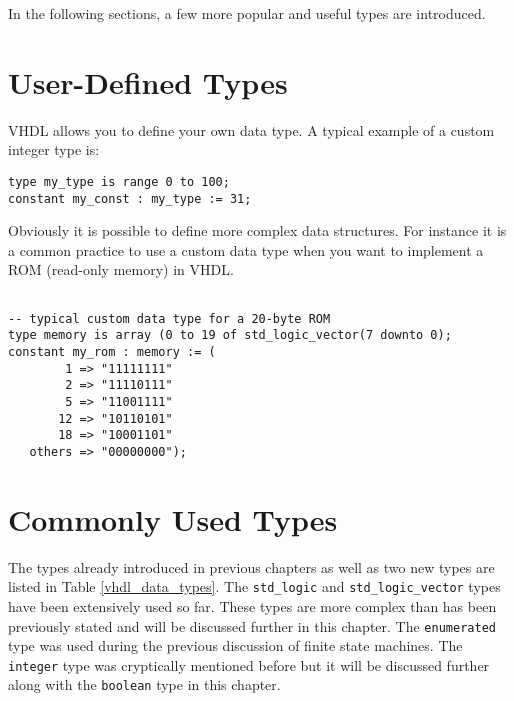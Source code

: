 In the following sections, a few more popular and useful types are introduced.

\section{User-Defined Types}
VHDL allows you to define your own data type. A typical example of a custom integer type is:

\noindent
\texttt{type my\_type is range 0 to 100;}\\
\texttt{constant my\_const : my\_type := 31;}

\noindent
Obviously it is possible to define more complex data structures. For instance it is a common practice to use a custom data type when you want to implement a ROM (read-only memory) in VHDL.

\noindent
\begin{minipage}{0.99\linewidth}
\begin{lstlisting}

-- typical custom data type for a 20-byte ROM
type memory is array (0 to 19 of std_logic_vector(7 downto 0);
constant my_rom : memory := (
        1 => "11111111"
        2 => "11110111"
        5 => "11001111"
       12 => "10110101"
       18 => "10001101"
   others => "00000000");
\end{lstlisting}
\end{minipage}

\section{Commonly Used Types}
The types already introduced in previous chapters as well as two new types are listed in Table \ref{vhdl_data_types}. The \texttt{std\_logic} and \texttt{std\_logic\_vector} types have been extensively used so far. These types are more complex than has been previously stated and will be discussed further in this chapter. The \texttt{enumerated} type was used during the previous discussion of finite state machines. The \texttt{integer} type was cryptically mentioned before but it will be discussed further along with the \texttt{boolean} type in this chapter.


